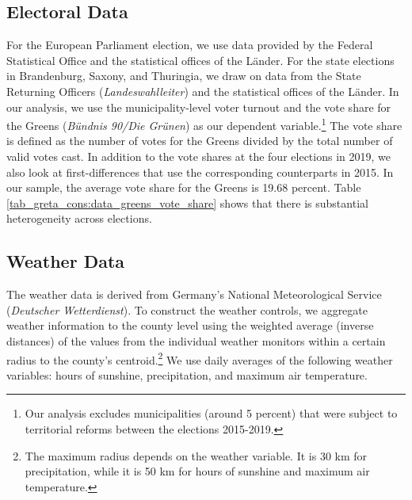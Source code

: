 









\subsection{Electoral Data}
For the European Parliament election, we use data provided by the Federal Statistical Office and the statistical offices of the Länder. For the state elections in Brandenburg, Saxony, and Thuringia, we draw on data from the State Returning Officers (\textit{Landeswahlleiter}) and the statistical offices of the Länder. In our analysis, we use the municipality-level voter turnout and the vote share for the Greens (\textit{Bündnis 90/Die Grünen}) as our dependent variable.\footnote{Our analysis excludes municipalities (around 5 percent) that were subject to territorial reforms between the elections 2015-2019.} The vote share is defined as the number of votes for the Greens divided by the total number of valid votes cast. In addition to the vote shares at the four elections in 2019, we also look at first-differences that use the corresponding counterparts in 2015. In our sample, the average vote share for the Greens is 19.68 percent. Table \ref{tab_greta_cons:data_greens_vote_share} shows that there is substantial heterogeneity across elections.












\subsection{Weather Data}
The weather data is derived from Germany's National Meteorological Service (\textit{Deutscher Wetterdienst}). To construct the weather controls, we aggregate weather information to the county level using the weighted average (inverse distances) of the values from the individual weather monitors within a certain radius to the county's centroid.\footnote{The maximum radius depends on the weather variable. It is 30 km for precipitation, while it is 50 km for hours of sunshine and maximum air temperature.} We use daily averages of the following weather variables: hours of sunshine, precipitation, and maximum air temperature. 



